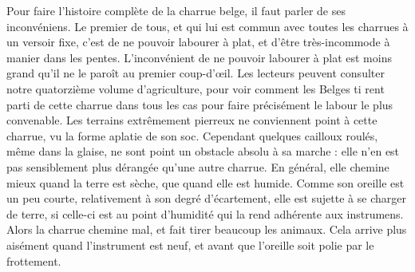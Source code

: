 Pour faire l'histoire complète de la charrue belge, il faut parler de ses inconvéniens. Le premier de tous, et qui lui est commun avec toutes les charrues à un versoir fixe, c'est de ne pouvoir labourer à plat, et d'être très-incommode à manier dans les pentes. L'inconvénient de ne pouvoir labourer à plat est moins grand qu'il ne le paroît au premier coup-d'œil. Les lecteurs peuvent consulter notre quatorzième volume d'agriculture, pour voir comment les Belges ti\setcounter{page}{405} rent parti de cette charrue dans tous les cas pour faire précisément le labour le plus convenable.
Les terrains extrêmement pierreux ne conviennent point à cette charrue, vu la forme aplatie de son soc. Cependant quelques cailloux roulés, même dans la glaise, ne sont point un obstacle absolu à sa marche : elle n'en est pas sensiblement plus dérangée qu'une autre charrue.
En général, elle chemine mieux quand la terre est sèche, que quand elle est humide. Comme son oreille est un peu courte, relativement à son degré d'écartement, elle est sujette à se charger de terre, si celle-ci est au point d'humidité qui la rend adhérente aux instrumens. Alors la charrue chemine mal, et fait tirer beaucoup les animaux. Cela arrive plus aisément quand l'instrument est neuf, et avant que l'oreille soit polie par le frottement.
